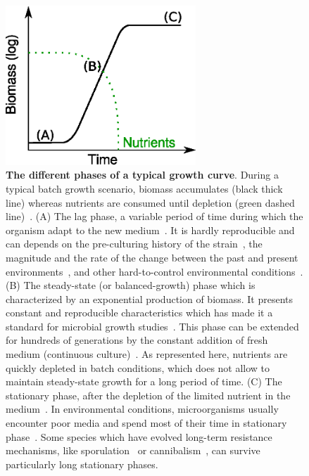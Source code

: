 \begin{figure}[p]
\centering
\includegraphics[height=6cm]{./Fig/Chapter1/growth_curve.eps}
\caption{
\textbf{The different phases of a typical growth curve}.
During a typical batch growth scenario, biomass accumulates (black thick line) whereas nutrients are consumed until depletion (green dashed line)~\cite{schaechter_microbe_2006}.
(A) The lag phase, a variable period of time during which the organism adapt to the new medium~\cite{swinnen_predictive_2004}.
It is hardly reproducible and can depends on the pre-culturing history of the strain~\cite{ng_damage_1962,dufrenne_effect_1997,shaw_effect_1967}, the magnitude and the rate of the change between the past and present environments~\cite{mcmeekin_predictive_2002}, and other hard-to-control environmental conditions~\cite{cheroutre-vialette_application_2002}.
(B) The steady-state (or balanced-growth) phase which is characterized by an exponential production of biomass.
It presents constant and reproducible characteristics which has made it a standard for microbial growth studies~\cite{schaechter_microbe_2006}.
This phase can be extended for hundreds of generations by the constant addition of fresh medium (continuous culture)~\cite{wang_robust_2010}.
As represented here, nutrients are quickly depleted in batch conditions, which does not allow to maintain steady-state growth for a long period of time.
(C) The stationary phase, after the depletion of the limited nutrient in the medium~\cite{chubukov_environmental_2014,schaechter_microbe_2006}.
In environmental conditions, microorganisms usually encounter poor media and spend most of their time in stationary phase~\cite{mcarthur_microbial_2006,menge_nitrogen_2012,hobbie_microbes_2013}.
Some species which have evolved long-term resistance mechanisms, like sporulation~\cite{stragier_molecular_1996} or cannibalism~\cite{gonzalez-pastor_cannibalism:_2011}, can survive particularly long stationary phases.
}
\label{fig:growth_curve}
\end{figure}

